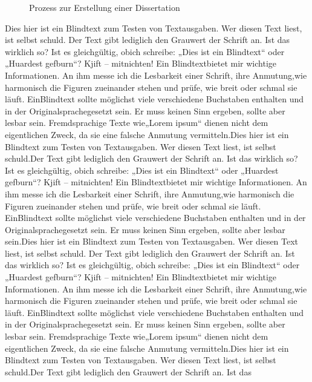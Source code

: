 \begin{figure}[hbt]
	\centering
	\caption{Prozess zur Erstellung einer Dissertation}
	\label{img:Dissertationsprozess}
\end{figure}

Dies hier ist ein Blindtext zum Testen von Textausgaben. Wer diesen Text liest, ist selbst schuld.
Der Text gibt lediglich den Grauwert der Schrift an. Ist das wirklich so? Ist es gleichgültig, obich schreibe:
„Dies ist ein Blindtext“ oder „Huardest gefburn“? Kjift – mitnichten! Ein Blindtextbietet mir wichtige Informationen. 
An ihm messe ich die Lesbarkeit einer Schrift, ihre Anmutung,wie harmonisch die Figuren zueinander stehen und prüfe, 
wie breit oder schmal sie läuft. EinBlindtext sollte möglichst viele verschiedene Buchstaben enthalten und in der 
Originalsprachegesetzt sein. Er muss keinen Sinn ergeben, sollte aber lesbar sein. Fremdsprachige Texte wie„Lorem ipsum“ 
dienen nicht dem eigentlichen Zweck, da sie eine falsche Anmutung vermitteln.Dies hier ist ein Blindtext zum Testen von 
Textausgaben. Wer diesen Text liest, ist selbst schuld.Der Text gibt lediglich den Grauwert der Schrift an. Ist das 
wirklich so? Ist es gleichgültig, obich schreibe: „Dies ist ein Blindtext“ oder „Huardest gefburn“? Kjift – mitnichten! 
Ein Blindtextbietet mir wichtige Informationen. An ihm messe ich die Lesbarkeit einer Schrift, ihre Anmutung,wie 
harmonisch die Figuren zueinander stehen und prüfe, wie breit oder schmal sie läuft. EinBlindtext sollte möglichst viele 
verschiedene Buchstaben enthalten und in der Originalsprachegesetzt sein. Er muss keinen Sinn ergeben, sollte aber lesbar 
sein.Dies hier ist ein Blindtext zum Testen von Textausgaben. Wer diesen Text liest, ist selbst schuld.
Der Text gibt lediglich den Grauwert der Schrift an. Ist das wirklich so? Ist es gleichgültig, obich schreibe:
„Dies ist ein Blindtext“ oder „Huardest gefburn“? Kjift – mitnichten! Ein Blindtextbietet mir wichtige Informationen. 
An ihm messe ich die Lesbarkeit einer Schrift, ihre Anmutung,wie harmonisch die Figuren zueinander stehen und prüfe, 
wie breit oder schmal sie läuft. EinBlindtext sollte möglichst viele verschiedene Buchstaben enthalten und in der 
Originalsprachegesetzt sein. Er muss keinen Sinn ergeben, sollte aber lesbar sein. Fremdsprachige Texte wie„Lorem ipsum“ 
dienen nicht dem eigentlichen Zweck, da sie eine falsche Anmutung vermitteln.Dies hier ist ein Blindtext zum Testen von 
Textausgaben. Wer diesen Text liest, ist selbst schuld.Der Text gibt lediglich den Grauwert der Schrift an. Ist das 
